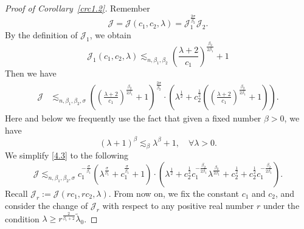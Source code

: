 \documentclass{article}
\numberwithin{equation}{section}
\numberwithin{equation}{section}
\theoremstyle{definition}
\begin{document}
\begin{proof}[Proof of Corollary~\ref{crc1.2}]
Remember
\begin{equation}
	\mathcal{J}=\mathcal{J}(c_1,c_2,\lambda)= \mathcal{J}_1 ^{\frac{2\sigma }{\beta_2}}\mathcal{J}_2.
\end{equation}
By the definition of $\mathcal{J}_1$, we obtain
\begin{equation}
	\mathcal{J}_1(c_1,c_2,\lambda)\lesssim_{n,\beta_1,\beta_2}  \left( \frac{\lambda+2}{c_1} \right) ^{\frac{\beta_2}{2\beta_1}}+1
\end{equation}
Then we have
\begin{equation}\label{4.3}
	\begin{aligned}
		\mathcal{J} &\lesssim_{n,\beta_1,\beta_2,\sigma }  \left( \left( \frac{\lambda+2}{c_1} \right) ^{\frac{\beta_2}{2\beta_1}}+1 \right)^{\frac{2\sigma }{\beta_2}}\!\!\!\!\! \cdot \left( \lambda ^{\frac{1}{2}}+ c_2^{\frac{1}{2}} \left( \left( \frac{\lambda+2}{c_1} \right) ^{\frac{\beta_2}{2\beta_1}}+1 \right)  \right). 
	\end{aligned}
\end{equation}
Here and below we frequently use the fact that given a fixed number $\beta >0$, we have
\begin{equation}
	\left( \lambda+ 1 \right)^{\beta} \lesssim_\beta \lambda^{ \beta}+1,\quad \forall \lambda>0.
\end{equation}
We simplify \eqref{4.3} to the following 
\begin{equation}\label{4.5}
		\mathcal{J}\lesssim_{n,\beta_1,\beta_2,\sigma} c_1^{-\frac{\sigma }{\beta_1}}\left( \lambda^{\frac{\sigma }{\beta_1}}+c_1^{\frac{\sigma }{\beta_1}}+1 \right)\!\cdot\! \left( \lambda^{\frac{1}{2}}+ c_2 ^{\frac{1}{2}}c_1^{-\frac{\beta_2}{2\beta_1}} \lambda ^{\frac{\beta_2}{2\beta_1}}+c_2^{\frac{1}{2}}+c_2^{\frac{1}{2}}c_1^{-\frac{\beta_2}{2\beta_1}} \right).
\end{equation}
Recall $\mathcal{J}_r:=\mathcal{J}(rc_1,rc_2,\lambda)$.
From now on, we fix the constant $c_1$ and $c_2$, and consider the change of $\mathcal{J}_r$ with respect to any positive real number $r$ under the condition $\lambda \ge r^{\frac{2}{\beta_1+2}}\widetilde{\lambda}_0$.


\end{proof}
\end{document}
